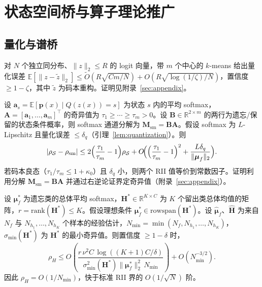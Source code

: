 \section{状态空间桥与算子理论推广}
\label{app:bridge}

\subsection{量化与谱桥}

\begin{lemma}[量化误差]
\label{lem:quantization}
对 $N$ 个独立同分布、$\|z\|_2\le R$ 的 logit 向量，带 $m$ 个中心的 $k$-means 给出量化误差 $\mathbb{E}[\|z-\tilde{z}\|_2] \le \tilde{O}(R\sqrt{Cm/N}) + O(R\sqrt{\log(1/\zeta)/N})$，置信度 $\ge1-\zeta$，其中 $\tilde{z}$ 为码本重构。证明见附录~\ref{sec:appendix}。
\end{lemma}

\begin{theorem}
\label{thm:state_bridge}
设 $\mathbf{a}_s = \mathbb{E}[\mathbf{p}(x) \mid Q(z(x))=s]$ 为状态 $s$ 内的平均 softmax，$\mathbf{A} = [\mathbf{a}_1,\dots,\mathbf{a}_m]^\top$ 的奇异值为 $\tau_1 \ge \cdots \ge \tau_m > 0$。设 $\mathbf{B}\in\mathbb{R}^{2\times m}$ 的两行为遗忘/保留的状态条件概率，则 softmax 通道分解为 $\mathbf{M}_{\mathrm{sm}}=\mathbf{B}\mathbf{A}$。假设 softmax 为 $L$-Lipschitz 且量化误差 $\le \delta_q$（引理~\ref{lem:quantization}）。则
\begin{equation}
|\rho_{\mathcal{S}} - \rho_{\mathrm{sm}}| \le 2\Bigl(\frac{\tau_1}{\tau_m}-1\Bigr)\rho_{\mathcal{S}} + O\!\Bigl(\Bigl(\frac{\tau_1}{\tau_m}-1\Bigr)^2 + \frac{L\delta_q}{\|\boldsymbol{\mu}_f\|_2}\Bigr).
\end{equation}
若码本良态（$\tau_1/\tau_m \le 1+\kappa_0$）且 $\delta_q$ 小，则两个 RII 值等价到常数因子。证明利用分解 $\mathbf{M}_{\mathrm{sm}}=\mathbf{B}\mathbf{A}$ 并通过右逆论证界定奇异值（附录~\ref{sec:appendix}）。
\end{theorem}

\begin{theorem}
\label{thm:softmax_deviation}
设 $\boldsymbol{\mu}_f^*$ 为遗忘类的总体平均 softmax，$\mathbf{H}^* \in \mathbb{R}^{K\times C}$ 为 $K$ 个留出类总体均值的矩阵，$r=\mathrm{rank}(\mathbf{H}^*)\le K$。假设理想条件 $\boldsymbol{\mu}_f^* \in \mathrm{rowspan}(\mathbf{H}^*)$。设 $\hat{\boldsymbol{\mu}}_f$、$\hat{\mathbf{H}}$ 为来自 $N_f$ 与 $N_{h_1},\dots,N_{h_K}$ 个样本的经验估计，$N_{\min} = \min(N_f,N_{h_1},\dots,N_{h_K})$，$\sigma_{\min}(\mathbf{H}^*)$ 为 $\mathbf{H}^*$ 的最小奇异值。则置信度 $\ge 1-\delta$ 时，
\begin{equation}
\rho_H \le O\!\left(\frac{r\,\nu^2 C\,\log((K+1)C/\delta)}{\sigma_{\min}^2(\mathbf{H}^*)\|\boldsymbol{\mu}_f^*\|_2^2\,N_{\min}}\right) + O(N_{\min}^{-3/2}).
\end{equation}
因此 $\rho_H = O(1/N_{\min})$，快于标准 RII 界的 $O(1/\sqrt{N})$ 阶。
\end{theorem}

